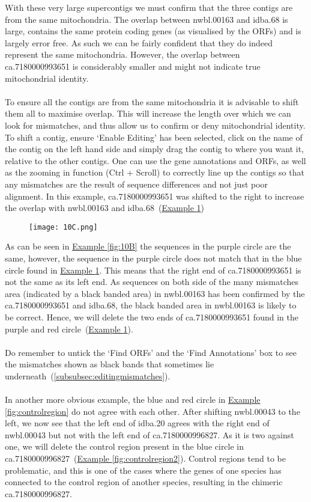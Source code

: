 \documentclass[11pt]{article}
\newcommand{\exautoref}[1]{\hyperref[#1]{Example \ref*{#1}}}
\begin{document}
With these very large supercontigs we must confirm that the three contigs are from the same mitochondria. The overlap between nwbl.00163 and idba.68 is large, contains the same protein coding genes (as visualised by the ORFs) and is largely error free. As such we can be fairly confident that they do indeed represent the same mitochondria. However, the overlap between ca.7180000993651 is considerably smaller and might not indicate true mitochondrial identity.
\\
\\
To ensure all the contigs are from the same mitochondria it is advisable to shift them all to maximise overlap. This will increase the length over which we can look for mismatches, and thus allow us to confirm or deny mitochondrial identity. To shift a contig, ensure `Enable Editing' has been selected, click on the name of the contig on the left hand side and simply drag the contig to where you want it, relative to the other contigs. One can use the gene annotations and ORFs, as well as the zooming in function (Ctrl + Scroll) to correctly line up the contigs so that any mismatches are the result of sequence differences and not just poor alignment. In this example, ca.7180000993651 was shifted to the right to increase the overlap with nwbl.00163 and idba.68~(\exautoref{fig:10C})

\begin{figure}[H]
  \centering
    \texttt{[image: 10C.png]}
  \label{fig:10C}
\end{figure}

As can be seen in \exautoref{fig:10B} the sequences in the purple circle are the same, however, the sequence in the purple circle does not match that in the blue circle found in \exautoref{fig:10C}. This means that the right end of ca.7180000993651 is not the same as its left end. As sequences on both side of the many mismatches area (indicated by a black banded area) in nwbl.00163 has been confirmed by the ca.7180000993651 and idba.68, the black banded area in nwbl.00163 is likely to be correct. Hence, we will delete the two ends of ca.7180000993651 found in the purple and red circle~(\exautoref{fig:10C}).
\\
\\
Do remember to untick the `Find ORFs' and the `Find Annotations' box to see the mismatches shown as black bands that sometimes lie underneath~(\autoref{subsubsec:editingmismatches}).
\\
\\
In another more obvious example, the blue and red circle in \exautoref{fig:controlregion} do not agree with each other. After shifting nwbl.00043 to the left, we now see that the left end of idba.20 agrees with the right end of nwbl.00043 but not with the left end of ca.7180000996827. As it is two against one, we will delete the control region present in the blue circle in ca.7180000996827~(\exautoref{fig:controlregion2}). Control regions tend to be problematic, and this is one of the cases where the genes of one species has connected to the control region of another species, resulting in the chimeric ca.7180000996827.
\end{document}
